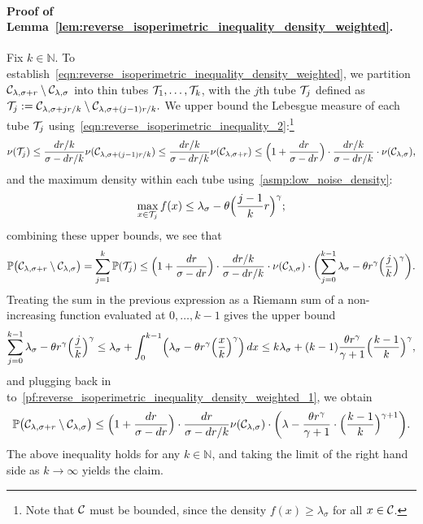 \paragraph{Proof of Lemma~\ref{lem:reverse_isoperimetric_inequality_density_weighted}.}
	Fix $k \in \mathbb{N}$. To establish~\eqref{eqn:reverse_isoperimetric_inequality_density_weighted}, we partition $\mathcal{C}_{\lambda,\sigma + r} \setminus \mathcal{C}_{\lambda,\sigma}$ into thin tubes $\mathcal{T}_{1},\ldots,\mathcal{T}_{k}$, with the $j$th tube $\mathcal{T}_j$ defined as $\mathcal{T}_j := \mathcal{C}_{\lambda,\sigma + jr/k} \setminus \mathcal{C}_{\lambda,\sigma + (j - 1)r/k}.$ We upper bound the Lebesgue measure of each tube $\mathcal{T}_j$ using~\eqref{eqn:reverse_isoperimetric_inequality_2}:\footnote{Note that $\mathcal{C}$ must be bounded, since the density $f(x) \geq \lambda_{\sigma}$ for all $x \in \mathcal{C}$.}
	\begin{equation*}
	\nu(\mathcal{T}_j) \leq \frac{dr/k}{\sigma - dr/k} \nu(\mathcal{C}_{\lambda,\sigma + (j - 1)r/k}) \leq \frac{dr/k}{\sigma - dr/k} \nu(\mathcal{C}_{\lambda,\sigma + r}) \leq \Bigl(1 + \frac{dr}{\sigma - dr}\Bigr) \cdot \frac{dr/k}{\sigma - dr/k}  \cdot \nu(\mathcal{C}_{\lambda,\sigma}),
	\end{equation*}
	and the maximum density within each tube using~\ref{asmp:low_noise_density}:
	\begin{equation*}
	\max_{x \in \mathcal{T}_j} f(x) \leq \lambda_{\sigma} - \theta \Bigl(\frac{j - 1}{k}r\Bigr)^{\gamma};
	\end{equation*}
	combining these upper bounds, we see that
	\begin{equation}
	\label{pf:reverse_isoperimetric_inequality_density_weighted_1}
	\mathbb{P}\bigl(\mathcal{C}_{\lambda,\sigma + r} \setminus \mathcal{C}_{\lambda,\sigma}\bigr) = \sum_{j = 1}^{k} \mathbb{P}(\mathcal{T}_j) \leq \Bigl(1 + \frac{dr}{\sigma - dr}\Bigr) \cdot  \frac{dr/k}{\sigma - dr/k} \cdot \nu(\mathcal{C}_{\lambda,\sigma}) \cdot \biggl(\sum_{j = 0}^{k - 1}\lambda_{\sigma} -  \theta r^{\gamma} \Bigl(\frac{j}{k}\Bigr)^{\gamma} \biggr).
	\end{equation}
	Treating the sum in the previous expression as a Riemann sum of a non-increasing function evaluated at $0,\ldots,k -1$ gives the upper bound
	\begin{equation*}
	\sum_{j = 0}^{k - 1}\lambda_{\sigma} -  \theta r^{\gamma} \Bigl(\frac{j}{k}\Bigr)^{\gamma } \leq \lambda_{\sigma} + \int_{0}^{k - 1} \Bigl(\lambda_{\sigma} -  \theta r^{\gamma} \Bigl(\frac{x}{k}\Bigr)^{\gamma}\Bigr) \,dx \leq k\lambda_{\sigma} + (k - 1)\frac{\theta r^{\gamma}}{\gamma + 1} \Bigl(\frac{k - 1}{k}\Bigr)^{\gamma},
	\end{equation*}
	and plugging back in to~\eqref{pf:reverse_isoperimetric_inequality_density_weighted_1}, we obtain
	\begin{equation*}
	\mathbb{P}\bigl(\mathcal{C}_{\lambda,\sigma + r} \setminus \mathcal{C}_{\lambda,\sigma}\bigr) \leq  \Bigl(1 + \frac{dr}{\sigma - dr}\Bigr) \cdot \frac{dr}{\sigma - dr/k} \nu(\mathcal{C}_{\lambda,\sigma}) \cdot \biggl(\lambda - \frac{\theta r^{\gamma}}{\gamma + 1} \cdot \Bigl(\frac{k - 1}{k}\Bigr)^{\gamma + 1} \biggl).
	\end{equation*}
	The above inequality holds for any $k \in \mathbb{N}$, and taking the limit of the right hand side as $k \to \infty$ yields the claim.

